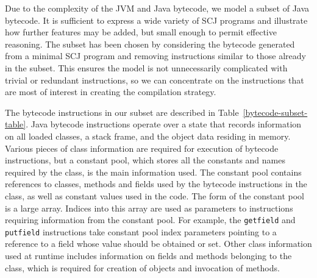 Due to the complexity of the JVM and Java bytecode, we model a subset
of Java bytecode.
It is sufficient to express a wide variety of SCJ programs and
illustrate how further features may be added, but small enough to
permit effective reasoning.
The subset has been chosen by considering the bytecode generated from
a minimal SCJ program and removing instructions similar to those
already in the subset.
This ensures the model is not unnecessarily complicated with trivial
or redundant instructions, so we can concentrate on the instructions
that are most of interest in creating the compilation strategy.

The bytecode instructions in our subset are described in
Table~\ref{bytecode-subset-table}.
Java bytecode instructions operate over a state that records
information on all loaded classes, a stack frame, and the object data
residing in memory.
Various pieces of class information are required for execution of
bytecode instructions, but a constant pool, which stores all the
constants and names required by the class, is the main information
used.
The constant pool contains references to classes, methods and fields
used by the bytecode instructions in the class, as well as constant
values used in the code.
The form of the constant pool is a large array.
Indices into this array are used as parameters to instructions
requiring information from the constant pool.
For example, the \texttt{getfield} and \texttt{putfield} instructions
take constant pool index parameters pointing to a reference to a field
whose value should be obtained or set.
Other class information used at runtime includes information on fields
and methods belonging to the class, which is required for creation of
objects and invocation of methods.

